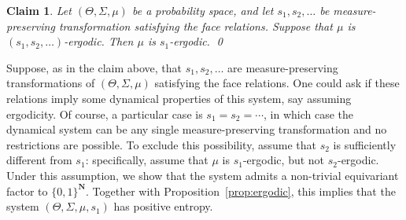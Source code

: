 \documentclass[12pt, pdflatex]{amsart}
\newtheorem{claim}[theorem]{Claim}
\theoremstyle{definition}
\numberwithin{equation}{section}
\numberwithin{theorem}{section}
\newcommand{\NN}{\mathbf{N}}
\begin{document}
\begin{claim}
  Let $(\Theta,\Sigma,\mu)$ be a probability space, and let $s_1,s_2,\ldots$ be measure-preserving transformation satisfying the face relations. Suppose that $\mu$ is $(s_1,s_2,\ldots)$-ergodic. Then $\mu$ is $s_1$-ergodic. \qed
\end{claim}

Suppose, as in the claim above, that $s_1, {s_2,\ldots}$ are measure-preserving transformations of $(\Theta,\Sigma,\mu)$ satisfying the face relations. One could ask if these relations imply some dynamical properties of this system, say assuming ergodicity. Of course, a particular case is $s_1=s_2=\cdots$, in which case the dynamical system can be any single measure-preserving transformation and no restrictions are possible. To exclude this possibility, assume that $s_2$ is sufficiently different from $s_1$: specifically, assume that $\mu$ is $s_1$-ergodic, but not $s_2$-ergodic. Under this assumption, we show that the system admits a non-trivial equivariant factor to $\{0,1\}^\NN$. Together with Proposition~\ref{prop:ergodic}, this implies that the system $(\Theta,\Sigma,\mu,s_1)$ has positive entropy.
\end{document}
